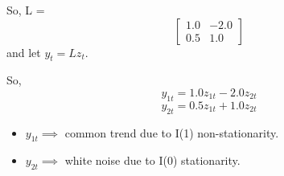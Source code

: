 \begin{frame}[allowframebreaks]
	\framebreak
	
	So, L = $$\begin{bmatrix} 1.0 & -2.0 \\ 0.5 & 1.0 \end{bmatrix}$$ and let $y_t = Lz_t$.
	
	So,
	$$y_{1t} = 1.0 z_{1t} - 2.0 z_{2t}$$
	$$y_{2t} = 0.5 z_{1t} + 1.0 z_{2t}$$
	
	\begin{itemize}
		\item $y_{1t} \implies$ common trend due to I(1) non-stationarity.
		\item $y_{2t} \implies$ white noise due to I(0) stationarity.
	\end{itemize}
	
	
	
	
	
	
	
	
	

\end{frame}
